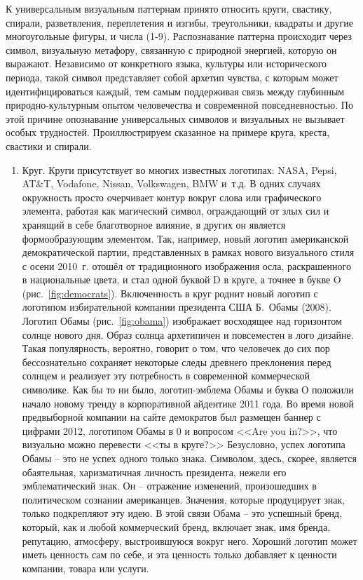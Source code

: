 К универсальным визуальным паттернам принято относить  круги, свастику, спирали,
разветвления, переплетения и изгибы, треугольники, квадраты и другие многоугольные
фигуры, и числа (1-9). Распознавание паттерна происходит через символ, визуальную
метафору, связанную с природной энергией, которую он выражают. Независимо от
конкретного языка, культуры или исторического периода, такой символ представляет
собой архетип чувства, с которым может идентифицироваться каждый, тем самым
поддерживая связь между глубинным природно-культурным опытом человечества и
современной повседневностью. По этой причине опознавание универсальных символов
и визуальных не вызывает особых трудностей. Проиллюстрируем сказанное на примере
круга, креста, свастики и спирали.
\begin{enumerate}
\item Круг. Круги присутствует во многих известных логотипах: NASA, Pepsi,
  AT\&T, Vodafone, Nissan, Volkswagen, BMW и~т.д. В одних случаях окружность
  просто очерчивает контур вокруг слова или графического элемента, работая
  как магический символ, ограждающий от злых сил и хранящий в себе благотворное
  влияние, в других он является формообразующим элементом. Так, например, новый
  логотип американской демократической партии, представленных в рамках нового
  визуального стиля с осени 2010~г. отошёл от традиционного изображения осла,
  раскрашенного в национальные цвета, и стал одной буквой D в круге, а точнее
  в букве O (рис.~\ref{fig:democrats}). Включенность в круг роднит новый логотип с логотипом
  избирательной компании президента США Б.~Обамы (2008). Логотип Обамы (рис.~\ref{fig:obama})
  изображает восходящее над горизонтом солнце нового дня. Образ солнца архетипичен
  и повсеместен в лого дизайне. Такая популярность, вероятно, говорит о том,
  что человечек до сих пор бессознательно сохраняет некоторые следы древнего
  преклонения перед солнцем и реализует эту потребность в современной
  коммерческой символике. Как бы то ни было, логотип-эмблема Обамы и буква О
  положили начало новому тренду в корпоративной айдентике 2011 года.
  Во время новой предвыборной компании на сайте демократов был размещен
  баннер с цифрами 2012, логотипом Обамы в 0 и вопросом <<Are you in?>>,
  что визуально можно перевести <<ты в круге?>> Безусловно, успех логотипа
  Обамы -- это не успех одного только знака. Символом, здесь, скорее,
  является обаятельная, харизматичная личность президента, нежели его
  эмблематический знак. Он -- отражение изменений, произошедших в политическом
  сознании американцев. Значения, которые продуцирует знак, только подкрепляют
  эту идею. В этой связи Обама -- это успешный бренд, который, как и любой
  коммерческий бренд, включает знак, имя бренда, репутацию, атмосферу,
  выстроившуюся вокруг него. Хороший логотип может иметь ценность сам по себе,
  и эта ценность только добавляет к ценности компании, товара или услуги.


\end{enumerate}
